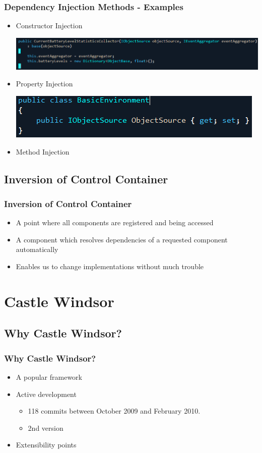 \documentclass[turkish,handout]{beamer}
\begin{document}
		{
			\frametitle{Dependency Injection Methods - Examples}
		  \begin{itemize}
		  	\item<1->Constructor Injection
		  		\begin{center}
						\includegraphics[scale=0.40]{images/constructorinjection.png}
					\end{center}
		  	\item<2->Property Injection
		  		\begin{center}
		  			\includegraphics[scale=0.40]{images/propertyinjection.png}
		  		\end{center}
		  	\item<3->Method Injection
		  \end{itemize}
		}
	\subsection{Inversion of Control Container}
	  \frame
		{
			\frametitle{Inversion of Control Container}
			\begin{itemize}
				\item<1->A point where all components are registered and being accessed
				\item<2->A component which resolves dependencies of a requested component automatically
				\item<3->Enables us to change implementations without much trouble
			\end{itemize}
		}
\section{Castle Windsor}
	\subsection{Why Castle Windsor?}
			\frame
			{
				\frametitle{Why Castle Windsor?}
			  \begin{itemize}
			  	\item<1->A popular framework
			  	\item<2->Active development
			  	\begin{itemize}
			  	  \item<3->118 commits between October 2009 and February 2010.   
			  		\item<4->2nd version
			  	\end{itemize}
			  	\item<5->Extensibility points
			  \end{itemize}
			}
\end{document}
